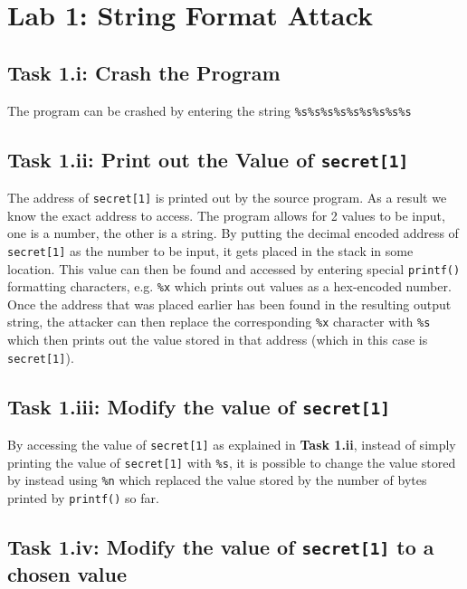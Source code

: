 \documentclass[11pt]{article}
\begin{document}
\section{Lab 1: String Format Attack}
\label{sec:org3a0e064}

\subsection{Task 1.i: Crash the Program}
\label{sec:orgd3794b2}

The program can be crashed by entering the string \texttt{\%s\%s\%s\%s\%s\%s\%s\%s\%s}


\subsection{Task 1.ii: Print out the Value of \texttt{secret[1]}}
\label{sec:org8341271}

The address of \texttt{secret[1]} is printed out by the source program. As a
result we know the exact address to access. The program allows for 2
values to be input, one is a number, the other is a string. By putting
the decimal encoded address of \texttt{secret[1]} as the number to be input, it
gets placed in the stack in some location. This value can then be
found and accessed by entering special \texttt{printf()} formatting
characters, e.g. \texttt{\%x} which prints out values as a hex-encoded
number. Once the address that was placed earlier has been found in the
resulting output string, the attacker can then replace the
corresponding \texttt{\%x} character with \texttt{\%s} which then prints out the value
stored in that address (which in this case is \texttt{secret[1]}).


\subsection{Task 1.iii: Modify the value of \texttt{secret[1]}}
\label{sec:org5fe8e5b}

By accessing the value of \texttt{secret[1]} as explained in \textbf{Task 1.ii},
instead of simply printing the value of \texttt{secret[1]} with \texttt{\%s}, it is
possible to change the value stored by instead using \texttt{\%n} which
replaced the value stored by the number of bytes printed by \texttt{printf()} so
far.


\subsection{Task 1.iv: Modify the value of \texttt{secret[1]} to a chosen value}
\label{sec:orgfed217e}
\end{document}
